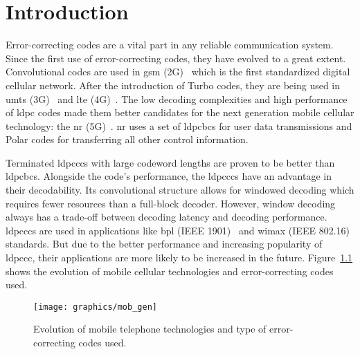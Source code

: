 \chapter{Introduction}
Error-correcting codes are a vital part in any reliable communication system. Since the first use of error-correcting codes, they have evolved to a great extent. Convolutional codes are used in \gls{gsm} (2G)~\cite{Gsm} which is the first standardized digital cellular network. After the introduction of Turbo codes, they are being used in \gls{umts} (3G)~\cite{3g} and \gls{lte} (4G)~\cite{Lte}. The low decoding complexities and high performance of \gls{ldpc} codes made them better candidates for the next generation mobile cellular technology: the \gls{nr} (5G)~\cite{Nra}. \gls{nr} uses a set of \glspl{ldpcbc} for user data transmissions and Polar codes for transferring all other control information.

Terminated \glspl{ldpccc} with large codeword lengths are proven to be better than \glspl{ldpcbc}. Alongside the code's performance, the \glspl{ldpccc} have an advantage in their decodability. Its convolutional structure allows for windowed decoding which requires fewer resources than a full-block decoder. However, window decoding always has a trade-off between decoding latency and decoding performance. \glspl{ldpccc} are used in applications like \gls{bpl} (IEEE 1901)~\cite{Bpl} and \gls{wimax} (IEEE 802.16)~\cite{Wimax} standards. But due to the better performance and increasing popularity of \gls{ldpccc}, their applications are more likely to be increased in the future. Figure~\ref{fig:mob_gen} shows the evolution of mobile cellular technologies and error-correcting codes used.

\begin{figure}[htbp]
  \centering
  \texttt{[image: graphics/mob\_gen]}
  \caption[Evolution of mobile telephone technologies and error-correcting codes.]{Evolution of mobile telephone technologies and type of error-correcting codes used.}
  \label{fig:mob_gen}
\end{figure}


